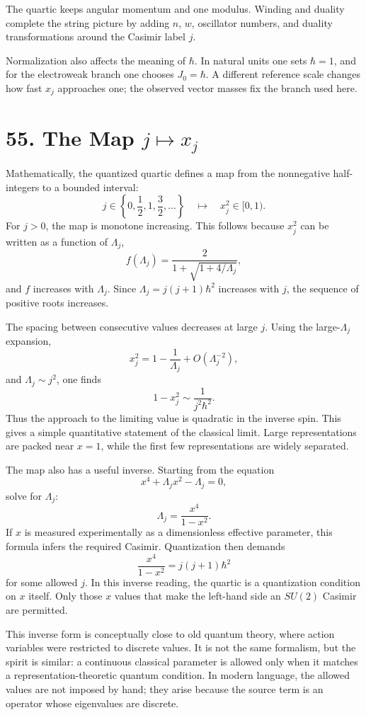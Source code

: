 \documentclass[11pt]{article}
\newcommand{\Lspin}{\Lambda_j}
\newcommand{\hb}{\hbar}
\begin{document}
The quartic keeps angular momentum and one modulus. Winding and duality complete the string picture by adding \(n\), \(w\), oscillator numbers, and duality transformations around the Casimir label \(j\).

Normalization also affects the meaning of \(\hb\). In natural units one sets \(\hb=1\), and for the electroweak branch one chooses \(J_0=\hb\). A different reference scale changes how fast \(x_j\) approaches one; the observed vector masses fix the branch used here.

\section*{55. The Map \(j\mapsto x_j\)}

Mathematically, the quantized quartic defines a map from the nonnegative half-integers to a bounded interval:
\[
        j\in\left\{0,\frac12,1,\frac32,\ldots\right\}
        \quad\mapsto\quad
        x_j^2\in[0,1).
\]
For \(j>0\), the map is monotone increasing. This follows because \(x_j^2\) can be written as a function of \(\Lspin\),
\[
        f(\Lspin)=\frac{2}{1+\sqrt{1+4/\Lspin}},
\]
and \(f\) increases with \(\Lspin\). Since \(\Lspin=j(j+1)\hb^2\) increases with \(j\), the sequence of positive roots increases.

The spacing between consecutive values decreases at large \(j\). Using the large-\(\Lspin\) expansion,
\[
        x_j^2=1-\frac{1}{\Lspin}+O(\Lspin^{-2}),
\]
and \(\Lspin\sim j^2\), one finds
\[
        1-x_j^2\sim \frac{1}{j^2\hb^2}.
\]
Thus the approach to the limiting value is quadratic in the inverse spin. This gives a simple quantitative statement of the classical limit. Large representations are packed near \(x=1\), while the first few representations are widely separated.

The map also has a useful inverse. Starting from the equation
\[
        x^4+\Lspin x^2-\Lspin=0,
\]
solve for \(\Lspin\):
\[
        \Lspin=\frac{x^4}{1-x^2}.
\]
If \(x\) is measured experimentally as a dimensionless effective parameter, this formula infers the required Casimir. Quantization then demands
\[
        \frac{x^4}{1-x^2}=j(j+1)\hb^2
\]
for some allowed \(j\). In this inverse reading, the quartic is a quantization condition on \(x\) itself. Only those \(x\) values that make the left-hand side an \(SU(2)\) Casimir are permitted.

This inverse form is conceptually close to old quantum theory, where action variables were restricted to discrete values. It is not the same formalism, but the spirit is similar: a continuous classical parameter is allowed only when it matches a representation-theoretic quantum condition. In modern language, the allowed values are not imposed by hand; they arise because the source term is an operator whose eigenvalues are discrete.
\end{document}
